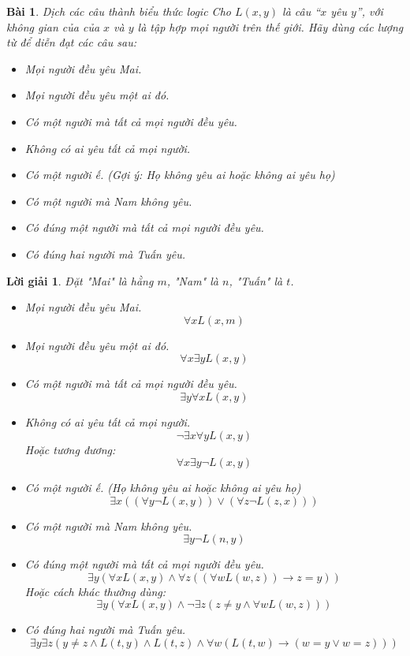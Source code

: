 \documentclass[11pt, oneside, a4paper]{article}
\newtheorem{bt}{Bài}[section]
\newtheorem{loigiai}{Lời giải}[bt]
\begin{document}
    \begin{bt}
    Dịch các câu thành biểu thức logic
    Cho $L(x,y)$ là câu ``$x$ yêu $y$'', với không gian của của $x$ và $y$ là tập hợp mọi người trên thế giới. Hãy dùng các lượng từ để diễn đạt các câu sau:
     \begin{itemize}
      \item[a)] Mọi người đều yêu Mai.
      \item[b)] Mọi người đều yêu một ai đó.
      \item[c)] Có một người mà tất cả mọi người đều yêu.
      \item[d)] Không có ai yêu tất cả mọi người.
      \item[e)] Có một người ế. (Gợi ý: Họ không yêu ai hoặc không ai yêu họ)
      \item[f)] Có một người mà Nam không yêu.
      \item[g)] Có đúng một người mà tất cả mọi người đều yêu.
      \item[h)] Có đúng hai người mà Tuấn yêu.
     \end{itemize}
    \end{bt}
    
    \begin{loigiai}
    Đặt "Mai" là hằng $m$, "Nam" là $n$, "Tuấn" là $t$.
    \begin{itemize}
        \item[a)] Mọi người đều yêu Mai.
            $$ \forall x L(x, m) $$
        \item[b)] Mọi người đều yêu một ai đó.
            $$ \forall x \exists y L(x, y) $$
        \item[c)] Có một người mà tất cả mọi người đều yêu.
            $$ \exists y \forall x L(x, y) $$
        \item[d)] Không có ai yêu tất cả mọi người.
            $$ \lnot \exists x \forall y L(x, y) $$
            Hoặc tương đương:
            $$ \forall x \exists y \lnot L(x, y) $$
        \item[e)] Có một người ế. (Họ không yêu ai hoặc không ai yêu họ)
            $$ \exists x ((\forall y \lnot L(x,y)) \lor (\forall z \lnot L(z,x))) $$
        \item[f)] Có một người mà Nam không yêu.
            $$ \exists y \lnot L(n, y) $$
        \item[g)] Có đúng một người mà tất cả mọi người đều yêu.
            $$ \exists y (\forall x L(x, y) \land \forall z ((\forall w L(w, z)) \rightarrow z=y)) $$
            Hoặc cách khác thường dùng:
            $$ \exists y (\forall x L(x,y) \land \lnot \exists z (z \neq y \land \forall w L(w,z))) $$
        \item[h)] Có đúng hai người mà Tuấn yêu.
            $$ \exists y \exists z (y \neq z \land L(t,y) \land L(t,z) \land \forall w (L(t,w) \rightarrow (w=y \lor w=z))) $$
    \end{itemize}
    \end{loigiai}
    
\end{document}
